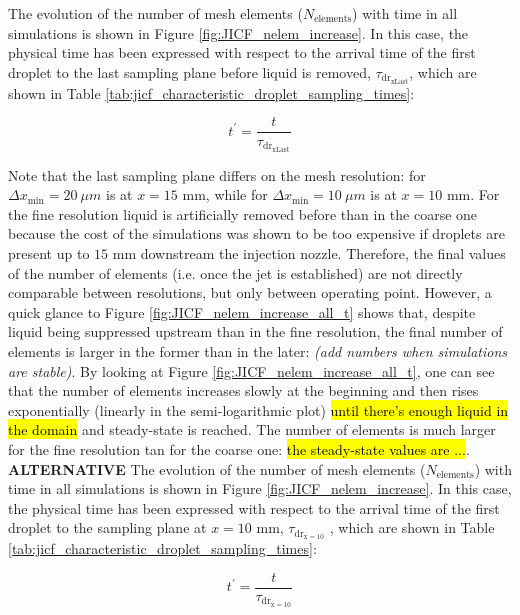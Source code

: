 The evolution of the number of mesh elements ($N_\mathrm{elements}$) with time in all simulations is shown in Figure \ref{fig:JICF_nelem_increase}. In this case, the physical time has been expressed with respect to the arrival time of the first droplet to the last sampling plane before liquid is removed, $\tau_\mathrm{dr_{xLast}}$, which are shown in Table \ref{tab:jicf_characteristic_droplet_sampling_times}:

\begin{equation}
t^{\prime} = \frac{t}{\tau_\mathrm{dr_{xLast}}}
\end{equation}

Note that the last sampling plane differs on the mesh resolution: for $\Delta x_\mathrm{min} = 20~\mu m$ is at $x = 15$ mm, while for $\Delta x_\mathrm{min} = 10~\mu m$ is at $x = 10$ mm. For the fine resolution liquid is artificially removed before than in the coarse one because the cost of the simulations was shown to be too expensive if droplets are present up to $15$ mm downstream the injection nozzle. Therefore, the final values of the number of elements (i.e. once the jet is established) are not directly comparable between resolutions, but only between operating point. However, a quick glance to Figure \ref{fig:JICF_nelem_increase_all_t} shows that, despite liquid being suppressed upstream than in the fine resolution, the final number of elements is larger in the former than in the later: \textsl{(add numbers when simulations are stable)}. By looking at Figure \ref{fig:JICF_nelem_increase_all_t}, one can see that the number of elements increases slowly at the beginning and then rises exponentially (linearly in the semi-logarithmic plot) \hl{until there's enough liquid in the domain} and steady-state is reached. The number of elements is much larger for the fine resolution tan for the coarse one: \hl{the steady-state values are ...}. \\

\textbf{ALTERNATIVE} The evolution of the number of mesh elements ($N_\mathrm{elements}$) with time in all simulations is shown in Figure \ref{fig:JICF_nelem_increase}. In this case, the physical time has been expressed with respect to the arrival time of the first droplet to the sampling plane at $x = 10$ mm, $\tau_\mathrm{dr_{x=10}}$ , which are shown in Table \ref{tab:jicf_characteristic_droplet_sampling_times}:



\begin{equation}
\label{eq:t_prime_with_tau_drx10}
t^{\prime} = \frac{t}{\tau_\mathrm{dr_{x=10}}}
\end{equation}

